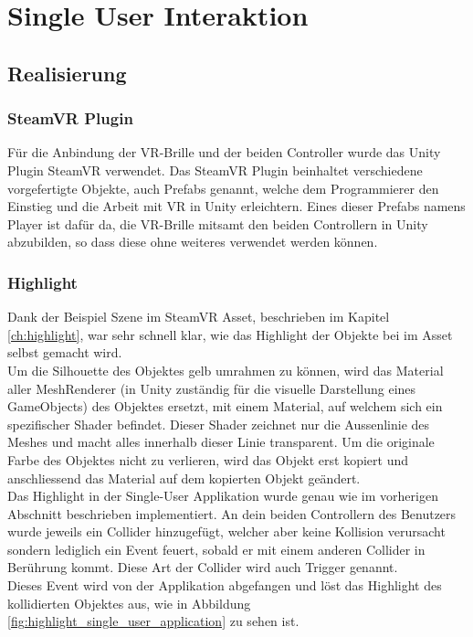 \chapter{Single User Interaktion}
\label{ch:Single_User_Interaktion}

\section{Realisierung}

\subsection{SteamVR Plugin}
Für die Anbindung der VR-Brille und der beiden Controller wurde das Unity Plugin SteamVR verwendet. Das SteamVR Plugin beinhaltet verschiedene vorgefertigte Objekte, auch Prefabs genannt, welche dem Programmierer den Einstieg und die Arbeit mit VR in Unity erleichtern. Eines dieser Prefabs namens \grqq Player\grqq{} ist dafür da, die VR-Brille mitsamt den beiden Controllern in Unity abzubilden, so dass diese ohne weiteres verwendet werden können.

\subsection{Highlight}
\label{ch:highlight_realisierung}
Dank der Beispiel Szene im SteamVR Asset, beschrieben im Kapitel \ref{ch:highlight}, war sehr schnell klar, wie das Highlight der Objekte bei im Asset selbst gemacht wird. \\
Um die Silhouette des Objektes gelb umrahmen zu können, wird das Material aller MeshRenderer (in Unity zuständig für die visuelle Darstellung eines GameObjects) des Objektes ersetzt, mit einem Material, auf welchem sich ein spezifischer Shader befindet. Dieser Shader zeichnet nur die Aussenlinie des Meshes und macht alles innerhalb dieser Linie transparent. Um die originale Farbe des Objektes nicht zu verlieren, wird das Objekt erst kopiert und anschliessend das Material auf dem kopierten Objekt geändert. \\

\noindent Das Highlight in der Single-User Applikation wurde genau wie im vorherigen Abschnitt beschrieben implementiert. An dein beiden Controllern des Benutzers wurde jeweils ein Collider hinzugefügt, welcher aber keine Kollision verursacht sondern lediglich ein Event feuert, sobald er mit einem anderen Collider in Berührung kommt. Diese Art der Collider wird auch Trigger genannt. \\
Dieses Event wird von der Applikation abgefangen und löst das Highlight des kollidierten Objektes aus, wie in Abbildung \ref{fig:highlight_single_user_application} zu sehen ist.

